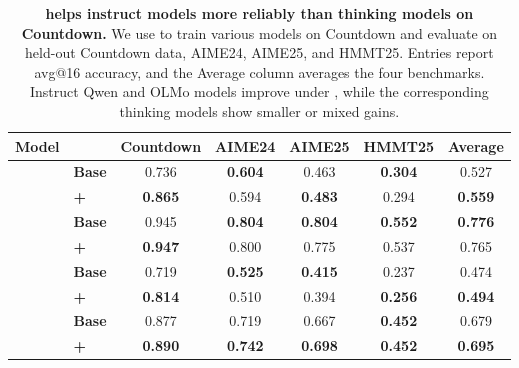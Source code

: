 \begin{table}[t]
\centering
\caption{\textbf{\opsd{} helps instruct models more reliably than thinking models on Countdown.}
We use \opsd{} to train various models on Countdown and evaluate on held-out Countdown data, AIME24, AIME25, and HMMT25. Entries report avg@16 accuracy, and the Average column averages the four benchmarks. Instruct Qwen and OLMo models improve under \opsd{}, while the corresponding thinking models show smaller or mixed gains.}
\label{tab:countdown_think_vs_instruct}
\small
\setlength{\tabcolsep}{5pt}
\renewcommand{\arraystretch}{1.15}

\newcommand{\metrichead}[1]{%
  \textbf{#1}%
}

\begin{tabular}{@{}llccccc@{}}
\toprule
\textbf{Model} &
& \metrichead{Countdown}
& \metrichead{AIME24}
& \metrichead{AIME25}
& \metrichead{HMMT25}
& \metrichead{Average} \\
\midrule

\multirow{2}{*}{\textbf{\qwenfourbinstruct{}}}
& \textbf{Base}
& 0.736
& \textbf{0.604}
& 0.463
& \textbf{0.304}
& 0.527 \\
&
\textbf{+\opsd{}}
& \textbf{0.865}
& 0.594
& \textbf{0.483}
& 0.294
& \textbf{0.559} \\
\midrule

\multirow{2}{*}{\textbf{\qwenfourbthink{}}}
& \textbf{Base}
& 0.945
& \textbf{0.804}
& \textbf{0.804}
& \textbf{0.552}
& \textbf{0.776} \\
&
\textbf{+\opsd{}}
& \textbf{0.947}
& 0.800
& 0.775
& 0.537
& 0.765 \\
\midrule

\multirow{2}{*}{\textbf{\olmosevenbinstruct{}}}
& \textbf{Base}
& 0.719
& \textbf{0.525}
& \textbf{0.415}
& 0.237
& 0.474 \\
&
\textbf{+\opsd{}}
& \textbf{0.814}
& 0.510
& 0.394
& \textbf{0.256}
& \textbf{0.494} \\
\midrule

\multirow{2}{*}{\textbf{\olmosevenbthink{}}}
& \textbf{Base}
& 0.877
& 0.719
& 0.667
& \textbf{0.452}
& 0.679 \\
&
\textbf{+\opsd{}}
& \textbf{0.890}
& \textbf{0.742}
& \textbf{0.698}
& \textbf{0.452}
& \textbf{0.695} \\

\bottomrule
\end{tabular}
\end{table}
